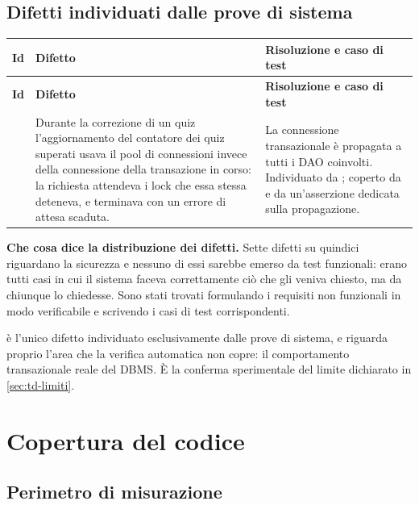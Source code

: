 \subsection{Difetti individuati dalle prove di sistema}

\begin{longtable}{@{}l L{5.6cm} L{6.4cm}@{}}
\toprule
\textbf{Id} & \textbf{Difetto} & \textbf{Risoluzione e caso di test} \\
\midrule
\endfirsthead
\toprule
\textbf{Id} & \textbf{Difetto} & \textbf{Risoluzione e caso di test} \\
\midrule
\endhead
\bottomrule
\endlastfoot

 &
Durante la correzione di un quiz l'aggiornamento del contatore dei quiz
superati usava il pool di connessioni invece della connessione della
transazione in corso: la richiesta attendeva i lock che essa stessa deteneva,
e terminava con un errore di attesa scaduta. &
La connessione transazionale è propagata a tutti i DAO coinvolti.
Individuato da ; coperto da  e da
un'asserzione dedicata sulla propagazione. \\

\end{longtable}

\begin{nota}
\textbf{Che cosa dice la distribuzione dei difetti.} Sette difetti su
quindici riguardano la sicurezza e nessuno di essi sarebbe emerso da test
funzionali: erano tutti casi in cui il sistema faceva correttamente ciò che
gli veniva chiesto, ma da chiunque lo chiedesse. Sono stati trovati
formulando i requisiti non funzionali in modo verificabile e scrivendo i casi
di test corrispondenti.

 è l'unico difetto individuato esclusivamente dalle prove di
sistema, e riguarda proprio l'area che la verifica automatica non copre: il
comportamento transazionale reale del DBMS. È la conferma sperimentale del
limite dichiarato in \cref{sec:td-limiti}.
\end{nota}

\section{Copertura del codice}
\label{sec:td-copertura}

\subsection{Perimetro di misurazione}

